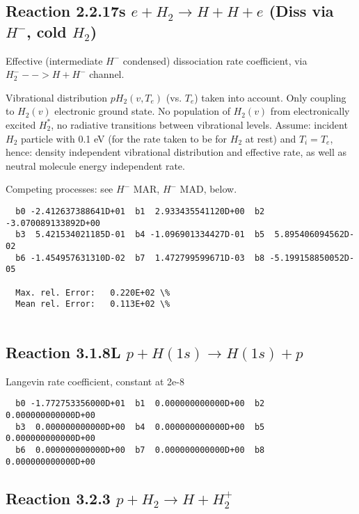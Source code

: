 \documentclass[12pt,dvipdfmx]{article}
\begin{document}
\subsection{
Reaction 2.2.17s  $e + H_2 \rightarrow H + H +e $  (Diss via $H^-$, cold $H_2$)
}
Effective (intermediate $H^-$ condensed) dissociation rate coefficient,
via $H_2^- --> H + H^-$ channel.


Vibrational distribution $pH_2(v,T_e)$ (vs. $T_e$) taken into
account. Only coupling
to $H_2(v)$ electronic ground state. No population of $H_2(v)$ from electronically
excited $H_2^*$, no radiative transitions between vibrational levels.
Assume: incident $H_2$ particle with 0.1 eV
(for the rate taken to be for $H_2$ at rest) and $T_i = T_e$,
hence: density independent vibrational distribution and effective
rate, as well as neutral molecule energy independent rate.

Competing processes: see $H^-$ MAR,  $H^-$ MAD, below.

\begin{small}\begin{verbatim}
  b0 -2.412637388641D+01  b1  2.933435541120D+00  b2 -3.070089133892D+00
  b3  5.421534021185D-01  b4 -1.096901334427D-01  b5  5.895406094562D-02
  b6 -1.454957631310D-02  b7  1.472799599671D-03  b8 -5.199158850052D-05

  Max. rel. Error:   0.220E+02 \%
  Mean rel. Error:   0.113E+02 \%


\end{verbatim}\end{small}

\subsection{
Reaction 3.1.8L   $p + H(1s) \rightarrow H(1s) + p  $
}
Langevin rate coefficient, constant at 2e-8


\begin{small}\begin{verbatim}
  b0 -1.772753356000D+01  b1  0.000000000000D+00  b2  0.000000000000D+00
  b3  0.000000000000D+00  b4  0.000000000000D+00  b5  0.000000000000D+00
  b6  0.000000000000D+00  b7  0.000000000000D+00  b8  0.000000000000D+00
\end{verbatim}\end{small}


\subsection{
Reaction 3.2.3   $p + H_2 \rightarrow H + H_2^+  $
}
\end{document}
